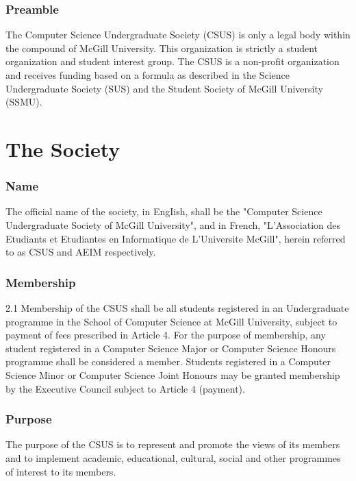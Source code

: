 \section*{Preamble}\label{preamble}

The Computer Science Undergraduate Society (CSUS) is only a legal body
within the compound of McGill University. This organization is strictly
a student organization and student interest group. The CSUS is a
non-profit organization and receives funding based on a formula as
described in the Science Undergraduate Society (SUS) and the Student
Society of McGill University (SSMU).

\part{The Society}\label{the-society}

\section{Name}\label{name}

The official name of the society, in EngIish, shall be the "Computer
Science Undergraduate Society of McGill University", and in French,
"L'Association des Etudiants et Etudiantes en Informatique de
L'Universite McGill", herein referred to as CSUS and AEIM respectively.

\section{Membership}\label{membership}

2.1 Membership of the CSUS shall be all students registered in an
Undergraduate programme in the School of Computer Science at McGill
University, subject to payment of fees prescribed in Article 4. For the
purpose of membership, any student registered in a Computer Science
Major or Computer Science Honours programme shall be considered a
member. Students registered in a Computer Science Minor or Computer
Science Joint Honours may be granted membership by the Executive Council
subject to Article 4 (payment).

\section{Purpose}\label{purpose}

The purpose of the CSUS is to represent and promote the views of its
members and to implement academic, educational, cultural, social and
other programmes of interest to its members.

